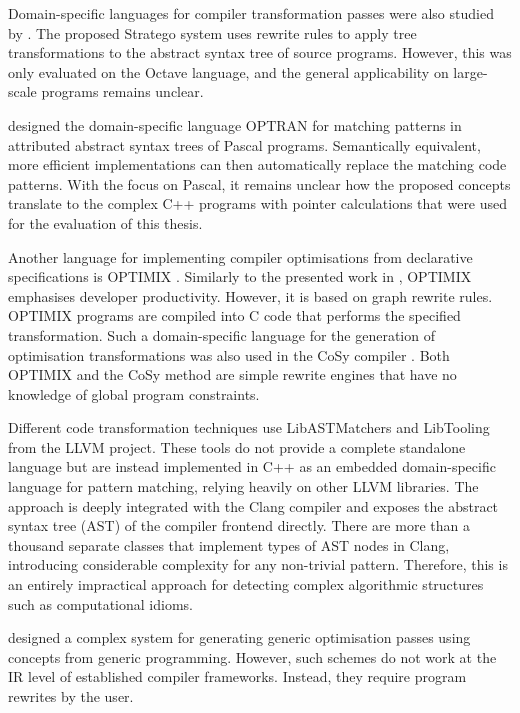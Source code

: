     Domain-specific languages for compiler transformation passes were also
    studied by \citet{Olmos:2005:CSD:2136624.2136643}.
    The proposed Stratego system uses rewrite rules to apply tree
    transformations to the abstract syntax tree of source programs.
    However, this was only evaluated on the Octave language, and the general
    applicability on large-scale programs remains unclear.

    \citet{Lipps1989} designed the domain-specific language OPTRAN for matching
    patterns in attributed abstract syntax trees of Pascal programs.
    Semantically equivalent, more efficient implementations can then
    automatically replace the matching code patterns.
    With the focus on Pascal, it remains unclear how the proposed concepts
    translate to the complex C++ programs with pointer calculations that were
    used for the evaluation of this thesis.

    Another language for implementing compiler optimisations from
    declarative specifications is OPTIMIX \citep{Assmann1996,Assmann98optimix}.
    Similarly to the presented work in , OPTIMIX emphasises
    developer productivity.
    However, it is based on graph rewrite rules.
    OPTIMIX programs are compiled into C code that performs the specified
    transformation.
    Such a domain-specific language for the generation of optimisation
    transformations was also used in the CoSy compiler \citep{Alt1994}.
    Both OPTIMIX and the CoSy method are simple rewrite engines that have no
    knowledge of global program constraints.

    Different code transformation techniques use LibASTMatchers
    and LibTooling \citep{be0fa11ddb194bde86a9dab8589b779c} from the
    LLVM project.
    These tools do not provide a complete standalone language but are instead
    implemented in C++ as an embedded domain-specific language for pattern
    matching, relying heavily on other LLVM libraries.
    The approach is deeply integrated with the Clang compiler and exposes the
    abstract syntax tree (AST) of the compiler frontend directly.
    There are more than a thousand separate classes that implement types
    of AST nodes in Clang, introducing considerable complexity for any
    non-trivial pattern.
    Therefore, this is an entirely impractical approach for detecting complex
    algorithmic structures such as computational idioms.

    \citet{Willcock:2009:RGP:1621607.1621611} designed a complex system for
    generating generic optimisation passes using concepts from generic
    programming.
    However, such schemes do not work at the IR level of established
    compiler frameworks.
    Instead, they require program rewrites by the user.

